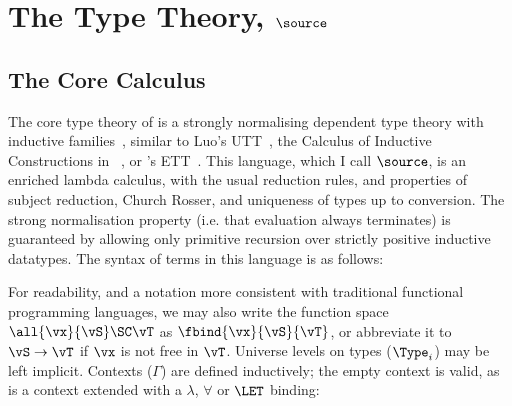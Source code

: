 \section{The Type Theory, $\source$}

\renewcommand{\Vnil}{\DC{vnil}}
\renewcommand{\Vcons}{\DC{vcons}}

\subsection{The Core Calculus}

\label{corett}

The core type theory of \Ivor{} is a strongly normalising dependent
type theory with inductive families~\cite{dybjer94}, similar to Luo's
UTT~\cite{luo94}, the Calculus of Inductive Constructions in
\Coq{}~\cite{coq-manual}, or \Epigram{}'s ETT~\cite{epireloaded}. 
This language, which I call $\source$, is an
enriched lambda calculus, with the usual reduction rules,
and properties of subject
reduction, Church Rosser, and uniqueness of types up to
conversion. The strong normalisation property (i.e. that evaluation
always terminates) is guaranteed by allowing only primitive recursion
over strictly positive inductive datatypes. The syntax of terms in
this language is as follows:


For readability, and a notation more consistent with traditional
functional programming languages, we may also write the function space
\mbox{$\all{\vx}{\vS}\SC\vT$} as \mbox{$\fbind{\vx}{\vS}{\vT}$}, or
abbreviate it to \mbox{$\vS\to\vT$} if $\vx$ is not free in
$\vT$. 
Universe levels on types ($\Type_i$) may be left implicit.
Contexts ($\Gamma$) are defined inductively; the empty context
is valid, as is a context extended with a $\lambda$, $\forall$ or
$\LET$ binding:



